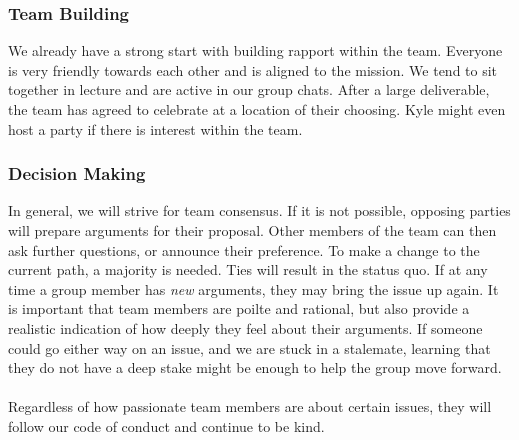 \documentclass{article}
\begin{document}
\subsubsection*{Team Building}

We already have a strong start with building rapport within the team. 
Everyone is very friendly towards each other and is aligned to the mission. We tend to sit together in lecture and are active in our group chats. 
After a large deliverable, the team has agreed to celebrate at a location of their choosing. Kyle might even host a party if there is interest within the team.


\subsubsection*{Decision Making} 

In general, we will strive for team consensus. If it is not possible, opposing parties will prepare arguments for their proposal.
Other members of the team can then ask further questions, or announce their preference. To make a change to the current path, a majority is needed. Ties will
result in the status quo. If at any time a group member has \textit{new} arguments, they may bring the issue up again. It is important that team members are
poilte and rational, but also provide a realistic indication of how deeply they feel about their arguments. If someone could go either way on an issue, and 
we are stuck in a stalemate, learning that they do not have a deep stake might be enough to help the group move forward.\\\\
Regardless of how passionate team members are about certain issues, they will follow our code of conduct and continue to be kind.

\end{document}
